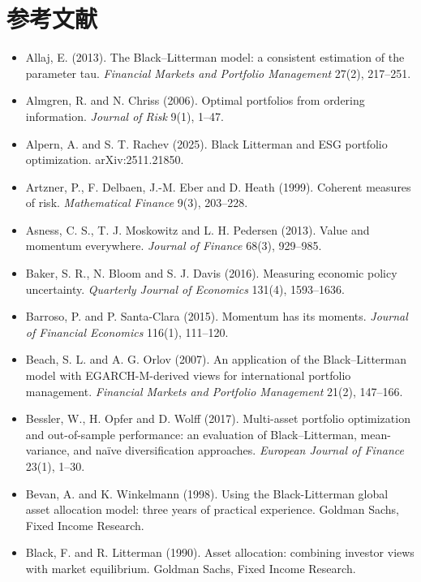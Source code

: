\chapter*{参考文献}

{\small
\begin{itemize}[leftmargin=1.2em,itemsep=0.25em,label={}]
\item Allaj, E. (2013). The Black--Litterman model: a consistent estimation of the parameter tau. \textit{Financial Markets and Portfolio Management} 27(2), 217--251.
\item Almgren, R. and N. Chriss (2006). Optimal portfolios from ordering information. \textit{Journal of Risk} 9(1), 1--47.
\item Alpern, A. and S. T. Rachev (2025). Black Litterman and ESG portfolio optimization. arXiv:2511.21850.
\item Artzner, P., F. Delbaen, J.-M. Eber and D. Heath (1999). Coherent measures of risk. \textit{Mathematical Finance} 9(3), 203--228.
\item Asness, C. S., T. J. Moskowitz and L. H. Pedersen (2013). Value and momentum everywhere. \textit{Journal of Finance} 68(3), 929--985.
\item Baker, S. R., N. Bloom and S. J. Davis (2016). Measuring economic policy uncertainty. \textit{Quarterly Journal of Economics} 131(4), 1593--1636.
\item Barroso, P. and P. Santa-Clara (2015). Momentum has its moments. \textit{Journal of Financial Economics} 116(1), 111--120.
\item Beach, S. L. and A. G. Orlov (2007). An application of the Black--Litterman model with EGARCH-M-derived views for international portfolio management. \textit{Financial Markets and Portfolio Management} 21(2), 147--166.
\item Bessler, W., H. Opfer and D. Wolff (2017). Multi-asset portfolio optimization and out-of-sample performance: an evaluation of Black--Litterman, mean-variance, and na\"ive diversification approaches. \textit{European Journal of Finance} 23(1), 1--30.
\item Bevan, A. and K. Winkelmann (1998). Using the Black-Litterman global asset allocation model: three years of practical experience. Goldman Sachs, Fixed Income Research.
\item Black, F. and R. Litterman (1990). Asset allocation: combining investor views with market equilibrium. Goldman Sachs, Fixed Income Research.

\end{itemize}}
